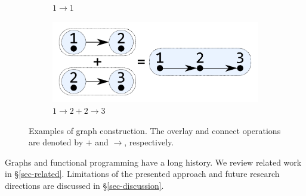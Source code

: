 \begin{figure}
\begin{subfigure}[b]{0.15\linewidth}
\vspace{2.4mm}
\caption{$1 \rightarrow 1$}
\end{subfigure}
\hspace{12mm}
\begin{subfigure}[b]{0.2\linewidth}
\centerline{\includegraphics[scale=0.27]{fig/ex-e-new.pdf}}
\vspace{-1mm}
\caption{$1 \rightarrow 2 + 2 \rightarrow 3$}
\end{subfigure}
\vspace{-1.5mm}
\caption{Examples of graph construction. The overlay and connect operations are denoted
by $+$ and $\rightarrow$, respectively.\label{fig-construction}}
\vspace{-3mm}
\end{figure}

Graphs and functional programming have a long history. We review related
work in \S\ref{sec-related}. Limitations of the presented approach and future
research directions are discussed in \S\ref{sec-discussion}.
